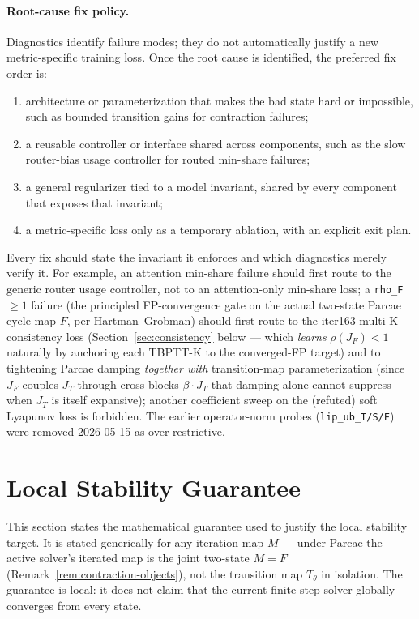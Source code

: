 \documentclass[11pt]{article}
\begin{document}
\paragraph{Root-cause fix policy.}
Diagnostics identify failure modes; they do not automatically justify a new
metric-specific training loss.  Once the root cause is identified, the
preferred fix order is:
\begin{enumerate}[leftmargin=2em,itemsep=0.2em]
  \item architecture or parameterization that makes the bad state hard or
        impossible, such as bounded transition gains for contraction failures;
  \item a reusable controller or interface shared across components, such as
        the slow router-bias usage controller for routed min-share failures;
  \item a general regularizer tied to a model invariant, shared by every
        component that exposes that invariant;
  \item a metric-specific loss only as a temporary ablation, with an explicit
        exit plan.
\end{enumerate}
Every fix should state the invariant it enforces and which diagnostics merely
verify it.  For example, an attention min-share failure should first route to
the generic router usage controller, not to an attention-only min-share loss;
a \texttt{rho\_F}$\ge 1$ failure (the principled FP-convergence gate on
the actual two-state Parcae cycle map $F$, per Hartman--Grobman) should
first route to the iter163 multi-K consistency loss (Section~\ref{sec:consistency}
below — which \emph{learns} $\rho(J_F)<1$ naturally by anchoring each
TBPTT-K to the converged-FP target) and to tightening Parcae damping
\emph{together with} transition-map parameterization (since $J_F$ couples
$J_T$ through cross blocks $\beta\cdot J_T$ that damping alone cannot
suppress when $J_T$ is itself expansive); another coefficient sweep on
the (refuted) soft Lyapunov loss is forbidden.  The earlier operator-norm
probes (\texttt{lip\_ub\_T/S/F}) were removed 2026-05-15 as
over-restrictive.

\section{Local Stability Guarantee}
\label{sec:lyapunov}

This section states the mathematical guarantee used to justify the local
stability target.  It is stated generically for any iteration map $M$ —
under Parcae the active solver's iterated map is the joint two-state
$M = F$ (Remark~\ref{rem:contraction-objects}), not the transition map
$T_\theta$ in isolation.  The guarantee is local: it does not claim that
the current finite-step solver globally converges from every state.
\end{document}
